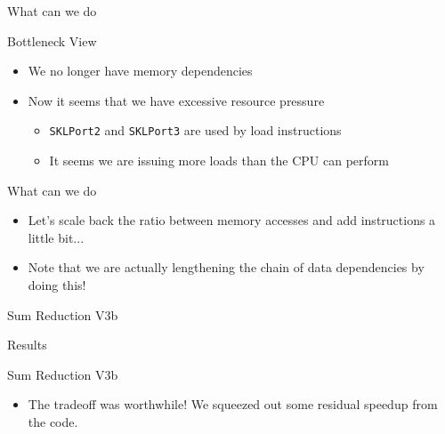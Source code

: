 \begin{frame}{What can we do}
\begin{block}{Bottleneck View}
\end{block}
\begin{itemize}
\item We no longer have memory dependencies
\item Now it seems that we have excessive resource pressure
	\begin{itemize}
	\item \texttt{SKLPort2} and \texttt{SKLPort3} are used by \alert{load instructions}
	\item It seems we are issuing more loads than the CPU can perform 
	\end{itemize}
\end{itemize}
\end{frame}


\begin{frame}{What can we do}
\begin{itemize}
\item Let's scale back the ratio between memory accesses and add instructions a little bit...
\item Note that we are actually \alert{lengthening} the chain of data dependencies by doing this!
\end{itemize}

\begin{block}{Sum Reduction V3b}
\end{block}
\end{frame}


\begin{frame}{Results}
\begin{block}{Sum Reduction V3b}
\end{block}
\begin{itemize}
\item The tradeoff was worthwhile! We squeezed out some residual speedup from the code.
\end{itemize}
\end{frame}


